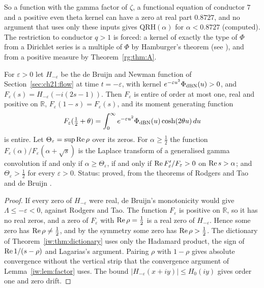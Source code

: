 So a function with the gamma factor of $\zeta$, a functional equation of conductor $7$ and a positive even theta kernel can have a zero at real part $0.8727$, and no argument that uses only these inputs gives $\mathrm{QRH}(\alpha)$ for $\alpha<0.8727$ (computed). The restriction to conductor $q>1$ is forced: a kernel of exactly the type of $\Phi$ from a Dirichlet series is a multiple of $\Phi$ by Hamburger's theorem \cite{NCHamburger21} (see \cite[Section~2.13]{Titchmarsh}), and from a positive measure by Theorem~\ref{rg:thm:A}.

\begin{proposition}\label{rg:prop:damped}
For $\varepsilon>0$ let $H_{-\varepsilon}$ be the de Bruijn and Newman function of Section~\ref{sec:ch21:flow} at time $t=-\varepsilon$, with kernel $e^{-\varepsilon u^2}\Phi_{\rm dBN}(u)>0$, and $F_\varepsilon(s)=H_{-\varepsilon}(-i(2s-1))$. Then $F_\varepsilon$ is entire of order at most one, real and positive on $\mathbb R$, $F_\varepsilon(1-s)=F_\varepsilon(s)$, and its moment generating function
\[
F_\varepsilon(\tfrac12+\theta)=\int_0^\infty e^{-\varepsilon u^2}\Phi_{\rm dBN}(u)\cosh(2\theta u)\,du
\]
is entire. Let $\Theta_\varepsilon=\sup\operatorname{Re}\rho$ over its zeros. For $\alpha\ge\frac12$ the function $F_\varepsilon(\alpha)/F_\varepsilon(\alpha+\sqrt s)$ is the Laplace transform of a generalised gamma convolution if and only if $\alpha\ge\Theta_\varepsilon$, if and only if $\operatorname{Re} F_\varepsilon'/F_\varepsilon>0$ on $\operatorname{Re} s>\alpha$; and $\Theta_\varepsilon>\frac12$ for every $\varepsilon>0$. Status: proved, from the theorems of Rodgers and Tao \cite{RodgersTao} and de Bruijn \cite{deBruijn}.
\end{proposition}

\begin{proof}
If every zero of $H_{-\varepsilon}$ were real, de Bruijn's monotonicity would give $\Lambda\le-\varepsilon<0$, against Rodgers and Tao. The function $F_\varepsilon$ is positive on $\mathbb R$, so it has no real zeros, and a zero of $F_\varepsilon$ with $\operatorname{Re}\rho=\frac12$ is a real zero of $H_{-\varepsilon}$. Hence some zero has $\operatorname{Re}\rho\ne\frac12$, and by the symmetry some zero has $\operatorname{Re}\rho>\frac12$. The dictionary of Theorem~\ref{iw:thm:dictionary} uses only the Hadamard product, the sign of $\operatorname{Re}1/(s-\rho)$ and Lagarias's argument. Pairing $\rho$ with $1-\rho$ gives absolute convergence without the vertical strip that the convergence argument of Lemma~\ref{iw:lem:factor} uses. The bound $|H_{-\varepsilon}(x+iy)|\le H_0(iy)$ gives order one and zero drift.
\end{proof}

